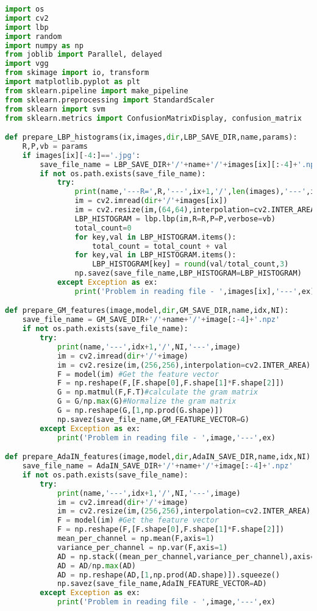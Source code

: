 \documentclass{article}
\begin{document}
\begin{lstlisting}[language=Python]
import os
import cv2
import lbp
import random
import numpy as np
from joblib import Parallel, delayed
import vgg
from skimage import io, transform
import matplotlib.pyplot as plt
from sklearn.pipeline import make_pipeline
from sklearn.preprocessing import StandardScaler
from sklearn import svm
from sklearn.metrics import ConfusionMatrixDisplay, confusion_matrix

def prepare_LBP_histograms(ix,images,dir,LBP_SAVE_DIR,name,params):
	R,P,vb = params
	if images[ix][-4:]=='.jpg':
		save_file_name = LBP_SAVE_DIR+'/'+name+'/'+images[ix][:-4]+'.npz'
		if not os.path.exists(save_file_name):
			try:
				print(name,'---R=',R,'---',ix+1,'/',len(images),'---',images[ix])
				im = cv2.imread(dir+'/'+images[ix])
				im = cv2.resize(im,(64,64),interpolation=cv2.INTER_AREA)
				LBP_HISTOGRAM = lbp.lbp(im,R=R,P=P,verbose=vb)
				total_count=0
				for key,val in LBP_HISTOGRAM.items():
					total_count = total_count + val
				for key,val in LBP_HISTOGRAM.items():
					LBP_HISTOGRAM[key] = round(val/total_count,3)
				np.savez(save_file_name,LBP_HISTOGRAM=LBP_HISTOGRAM)
			except Exception as ex:
				print('Problem in reading file - ',images[ix],'---',ex)

def prepare_GM_features(image,model,dir,GM_SAVE_DIR,name,idx,NI):
	save_file_name = GM_SAVE_DIR+'/'+name+'/'+image[:-4]+'.npz'
	if not os.path.exists(save_file_name):
		try:
			print(name,'---',idx+1,'/',NI,'---',image)
			im = cv2.imread(dir+'/'+image)
			im = cv2.resize(im,(256,256),interpolation=cv2.INTER_AREA)
			F = model(im) #Get the feature vector
			F = np.reshape(F,[F.shape[0],F.shape[1]*F.shape[2]])
			G = np.matmul(F,F.T)#calculate the gram matrix
			G = G/np.max(G)#Normalize the gram matrix
			G = np.reshape(G,[1,np.prod(G.shape)])
			np.savez(save_file_name,GM_FEATURE_VECTOR=G)
		except Exception as ex:
			print('Problem in reading file - ',image,'---',ex)

def prepare_AdaIN_features(image,model,dir,AdaIN_SAVE_DIR,name,idx,NI):
	save_file_name = AdaIN_SAVE_DIR+'/'+name+'/'+image[:-4]+'.npz'
	if not os.path.exists(save_file_name):
		try:
			print(name,'---',idx+1,'/',NI,'---',image)
			im = cv2.imread(dir+'/'+image)
			im = cv2.resize(im,(256,256),interpolation=cv2.INTER_AREA)
			F = model(im) #Get the feature vector
			F = np.reshape(F,[F.shape[0],F.shape[1]*F.shape[2]])
			mean_per_channel = np.mean(F,axis=1)
			variance_per_channel = np.var(F,axis=1)
			AD = np.stack((mean_per_channel,variance_per_channel),axis=1)
			AD = AD/np.max(AD)
			AD = np.reshape(AD,[1,np.prod(AD.shape)]).squeeze()
			np.savez(save_file_name,AdaIN_FEATURE_VECTOR=AD)
		except Exception as ex:
			print('Problem in reading file - ',image,'---',ex)


\end{lstlisting}
\end{document}
